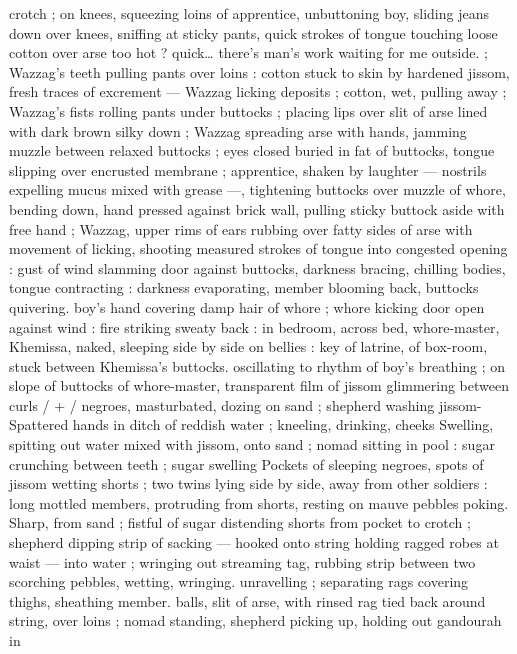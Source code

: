crotch ; on knees, squeezing loins of apprentice, unbuttoning boy, 
sliding jeans down over knees, sniffing at sticky pants, quick strokes 
of tongue touching loose cotton over arse{\td} {\gl} too hot ?{\td} quick{\ldots} 
there's man's work waiting for me outside. {\gr} ; Wazzag's teeth pulling 
pants over loins : cotton stuck to skin by hardened jissom, fresh 
traces of excrement --- Wazzag licking deposits ; cotton, wet, pulling 
away ; Wazzag's fists rolling pants under buttocks ; placing lips over 
slit of arse lined with dark brown silky down ; Wazzag spreading arse 
with hands, jamming muzzle between relaxed buttocks ; eyes closed 
buried in fat of buttocks, tongue slipping over encrusted membrane 
; apprentice, shaken by laughter --- nostrils expelling mucus mixed 
with grease ---, tightening buttocks over muzzle of whore, bending 
down, hand pressed against brick wall, pulling sticky buttock aside 
with free hand ; Wazzag, upper rims of ears rubbing over fatty sides 
of arse with movement of licking, shooting measured strokes of 
tongue into congested opening : gust of wind slamming door against 
buttocks, darkness bracing, chilling bodies, tongue contracting : 
darkness evaporating, member blooming back, buttocks quivering. 
boy's hand covering damp hair of whore ; whore kicking door open 
against wind : fire striking sweaty back : in bedroom, across bed, 
whore-master, Khemissa, naked, sleeping side by side on bellies : 
key of latrine, of box-room, stuck between Khemissa's buttocks. 
oscillating to rhythm of boy's breathing ; on slope of buttocks of 
whore-master, transparent film of jissom glimmering between curls {\slash} 
+ {\slash} negroes, masturbated, dozing on sand ; shepherd washing jissom- 
Spattered hands in ditch of reddish water ; kneeling, drinking, cheeks 
Swelling, spitting out water mixed with jissom, onto sand ; nomad 
sitting in pool : sugar crunching between teeth ; sugar swelling 
Pockets of sleeping negroes, spots of jissom wetting shorts ; two 
twins lying side by side, away from other soldiers : long mottled 
members, protruding from shorts, resting on mauve pebbles poking. 
Sharp, from sand ; fistful of sugar distending shorts from pocket to 
crotch ; shepherd dipping strip of sacking --- hooked onto string 
holding ragged robes at waist --- into water ; wringing out streaming 
tag, rubbing strip between two scorching pebbles, wetting, wringing. 
unravelling ; separating rags covering thighs, sheathing member. 
balls, slit of arse, with rinsed rag tied back around string, over loins 
; nomad standing, shepherd picking up, holding out gandourah in 
